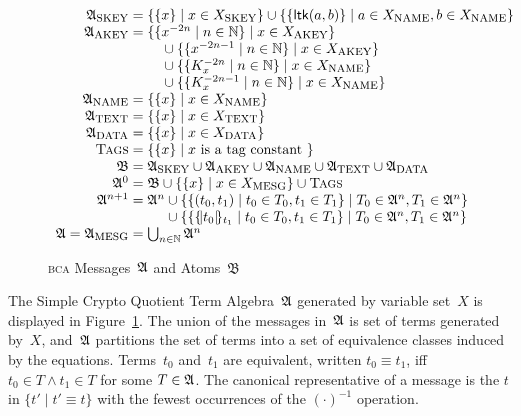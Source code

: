 \documentclass[12pt]{article}
\theoremstyle{definition}
\newcommand{\scap}[1]{\ensuremath{\mathop{\relax
                    \smash{\mbox{\sc#1}}}\!\mathop{\vphantom{#1}}\nolimits}}
\newcommand{\bca}{\textsc{bca}}
\newcommand{\alga}{\alg{A}}
\newcommand{\base}{\ensuremath{\mathfrak B}}
\begin{document}
\begin{figure}
$$\begin{array}{r@{{}={}}l}
\alga_{\scap{skey}}&\{\{x\}\mid x \in X_{\scap{skey}}\} \cup \{\{\cn{ltk}(a,b)\}\mid a \in X_{\scap{name}}, b \in X_{\scap{name}}\}\\
\alga_{\scap{akey}}&\begin{array}[t]{@{}l}
\{\{x^{-2n}\mid n\in\nat\}\mid x\in X_{\scap{akey}}\}\\
\quad{}\cup\{\{x^{-2n-1}\mid n\in\nat\}\mid x\in X_{\scap{akey}}\}\\
\quad{}\cup\{\{K_x^{-2n}\mid n\in\nat\}\mid x\in X_{\scap{name}}\}\\
\quad{}\cup\{\{K_x^{-2n-1}\mid n\in\nat\}\mid x\in X_{\scap{name}}\}\\
\end{array}\\
\alga_{\scap{name}}&\{\{x\}\mid x \in X_{\scap{name}}\}\\
\alga_{\scap{text}}&\{\{x\}\mid x \in X_{\scap{text}}\}\\
\alga_{\scap{data}}&\{\{x\}\mid x \in X_{\scap{data}}\}\\
\scap{Tags}&\{\{x\}\mid x \hbox{ is a tag constant }\}\\
\base&\alga_{\scap{skey}} \cup \alga_{\scap{akey}} \cup \alga_{\scap{name}} \cup \alga_{\scap{text}} \cup \alga_{\scap{data}}\\
\alga^0&\base\cup \{\{x\}\mid x\in X_{\scap{mesg}}\} \cup \scap{Tags}\\
\alga^{n+1}&\alga^n
\begin{array}[t]{@{}l}
{}\cup\{\{(t_0,t_1)\mid t_0\in T_0, t_1\in T_1\}\mid
 T_0\in\alga^n,T_1\in\alga^n\}\\
{}\cup\{\{\enc{t_0}{t_1}\mid t_0\in T_0, t_1\in T_1\}\mid
 T_0\in\alga^n,T_1\in\alga^n\}
\end{array}\\
\alga = \alga_{\scap{mesg}}&\bigcup_{n\in\nat}\alga^n
\end{array}$$
\caption{{\bca} Messages~$\alga$ and Atoms~$\base$}\label{fig:algebra}
\end{figure}

The Simple Crypto Quotient Term Algebra~$\alga$ generated by variable
set~$X$ is displayed in Figure~\ref{fig:algebra}.  The union of the
messages in~$\alga$ is set of terms generated by~$X$, and~$\alga$
partitions the set of terms into a set of equivalence classes induced
by the equations.  Terms~$t_0$ and~$t_1$ are equivalent, written
$t_0\equiv t_1$, iff $t_0\in T\land t_1\in T$ for some $T\in\alga$.
The canonical representative of a message is the $t$ in $\{t'\mid
t'\equiv t\}$ with the fewest occurrences of the $(\cdot)^{-1}$
operation.
\end{document}

